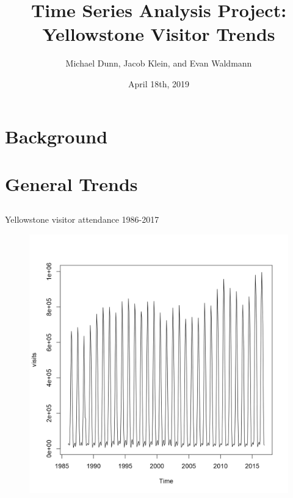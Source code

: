 \documentclass[xcolor=dvipsnames]{beamer}
\title[Yellowstone Visitor Trends]{Time Series Analysis Project:\\ Yellowstone Visitor Trends}
\author{Michael Dunn, Jacob Klein, and Evan Waldmann}
\institute{University of Central Florida}
\date{\scriptsize{April 18th, 2019}}
\begin{document}
\begin{frame}
  \titlepage
  \vfill

\end{frame}

\section{Background}




\subsection{}


\section{General Trends}
\subsection{}

\begin{frame}{Yellowstone visitor attendance 1986-2017}
%
\begin{figure}
\centering\includegraphics[width=.63\linewidth]{../normalplots/visits-ts-plot.png}
\end{figure}
\end{frame}
\end{document}
